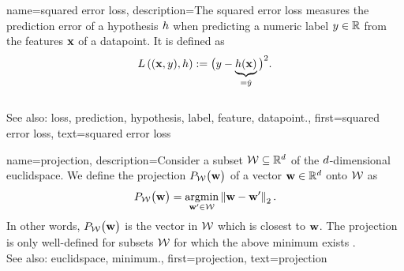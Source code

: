 {name={squared error loss},
	description={The squared 
		error \gls{loss} measures the \gls{prediction} error of a 
		\gls{hypothesis} $h$ when predicting a numeric \gls{label} $y \in \mathbb{R}$ 
		from the \glspl{feature} ${\bf x}$ of a \gls{datapoint}. It is defined as 
\begin{equation} 
	\nonumber
	L\left(({\bf x},y),h \right) := \big(y - \underbrace{h({\bf x})}_{=\hat{y}} \big)^{2}. 
\end{equation} 
			\\ 
		See also: \gls{loss}, \gls{prediction}, \gls{hypothesis}, \gls{label}, \gls{feature}, \gls{datapoint}.},
	first={squared error loss},
	text={squared error loss}
}


 {name={projection}, 
       description={Consider a subset $\mathcal{W} \subseteq \mathbb{R}^{d}$ of 
	   the $d$-dimensional \gls{euclidspace}. We define the projection $P_{\mathcal{W}}\big( {\bf w}\big)$
	   of a vector ${\bf w} \in \mathbb{R}^{d}$ onto $\mathcal{W}$ as
	   \begin{equation} 
   	   	\label{equ_def_proj_generic_dict}
  	    	P_{\mathcal{W}}\big( {\bf w}\big) = \operatorname*{argmin}_{{\bf w}' \in \mathcal{W}} \left\Vert {{\bf w}- {\bf w}'} \right\Vert_{2}. 
        	    \end{equation}
	    In other words, $P_{\mathcal{W}}\big( {\bf w}\big)$ is the vector in $\mathcal{W}$ 
	    which is closest to ${\bf w}$. The projection is only well-defined for subsets $\mathcal{W}$ 
	    for which the above \gls{minimum} exists \cite{BoydConvexBook}.
		 			\\ 
	    See also: \gls{euclidspace}, \gls{minimum}.},
	first={projection},
	text={projection}
}


